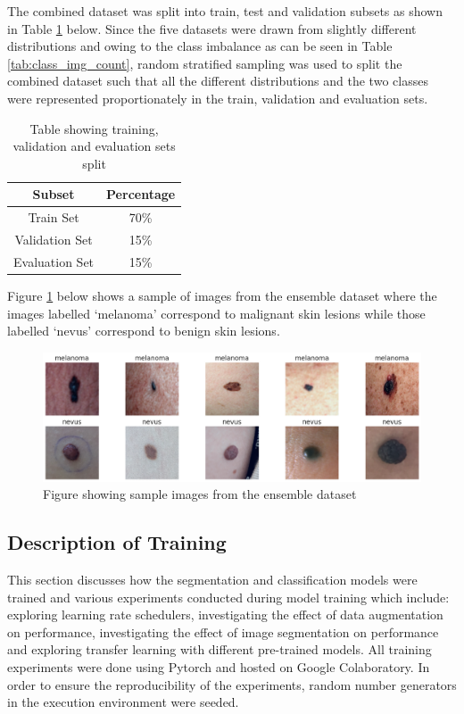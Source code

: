 \documentclass[12pt, a4paper]{article}
\begin{document}
The combined dataset was split into train, test and validation subsets as shown in Table \ref{tab:dataset-split} below. Since the five datasets were drawn from slightly different distributions and owing to the class imbalance as can be seen in Table \ref{tab:class_img_count}, random stratified sampling was used to split the combined dataset such that all the different distributions and the two classes were represented proportionately in the train, validation and evaluation sets.

\begin{table}[h]
    \centering
    \begin{tabular}{|c|c|}
    \hline
        \textbf{Subset} & \textbf{Percentage}\\\hline
        Train Set & 70\% \\\hline
        Validation Set & 15\%\\\hline
        Evaluation Set & 15\%\\\hline
    \end{tabular}
    \caption{Table showing training, validation and evaluation sets split}
    \label{tab:dataset-split}
\end{table}

Figure \ref{fig:samples} below shows a sample of images from the ensemble dataset where the images labelled `melanoma' correspond to malignant skin lesions while those labelled `nevus' correspond to benign skin lesions.

\begin{figure}[h]
    \centering
    \setlength{\fboxsep}{8pt}
    \includegraphics[scale=0.4, fbox]{images/samples.png}
    \caption{Figure showing sample images from the ensemble dataset}
    \label{fig:samples}
\end{figure}


\subsection{Description of Training}
This section discusses how the segmentation and classification models were trained and various experiments conducted during model training which include: exploring learning rate schedulers, investigating the effect of data augmentation on performance, investigating the effect of image segmentation on performance and exploring transfer learning with different pre-trained models. All training experiments were done using Pytorch and hosted on Google Colaboratory. In order to ensure the reproducibility of the experiments, random number generators in the execution environment were seeded.
\end{document}
